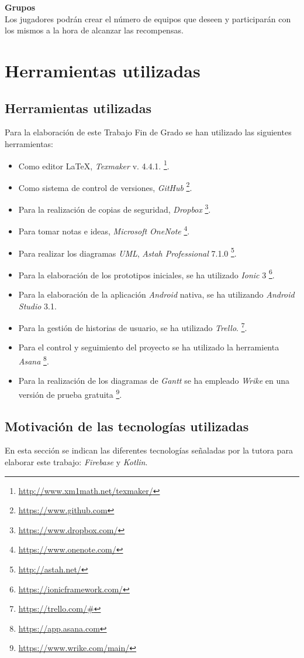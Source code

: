 \documentclass[twoside]{report}
\begin{document}
\textbf{Grupos}\\

Los jugadores podrán crear el número de equipos que deseen y participarán con los mismos a la hora de alcanzar las recompensas.

\chapter{Herramientas utilizadas}
\section{Herramientas utilizadas}

Para la elaboración de este Trabajo Fin de Grado se han utilizado las siguientes herramientas:
\begin{itemize}
\item Como editor \LaTeX , \textit{Texmaker} v. 4.4.1. \footnote{\url{http://www.xm1math.net/texmaker/}}.
\item Como sistema de control de versiones, \textit{GitHub} \footnote{\url{https://www.github.com}}.
\item Para la realización de copias de seguridad, \textit{Dropbox} \footnote{\url{https://www.dropbox.com/}}.
\item Para tomar notas e ideas, \textit{Microsoft OneNote} \footnote{\url{https://www.onenote.com/}}.
\item Para realizar los diagramas \textit{UML}, \textit{Astah Professional} 7.1.0  \footnote{\url{http://astah.net/}}.
\item Para la elaboración de los prototipos iniciales, se ha utilizado \textit{Ionic} 3 \footnote{\url{https://ionicframework.com/}}.
\item Para la elaboración de la aplicación \textit{Android} nativa, se ha utilizando \textit{Android Studio} 3.1.
\item Para la gestión de historias de usuario, se ha utilizado \textit{Trello}. \footnote{\url{https://trello.com/#}}.
\item Para el control y seguimiento del proyecto se ha utilizado la herramienta \textit{Asana} \footnote{\url{https://app.asana.com}}.
\item Para la realización de los diagramas de \textit{Gantt} se ha empleado \textit{Wrike} en una versión de prueba gratuita \footnote{\url{https://www.wrike.com/main/}}.
\end{itemize}

\section{Motivación de las tecnologías utilizadas}
En esta sección se indican las diferentes tecnologías señaladas por la tutora para elaborar este trabajo: \textit{Firebase} y \textit{Kotlin}.
\end{document}
